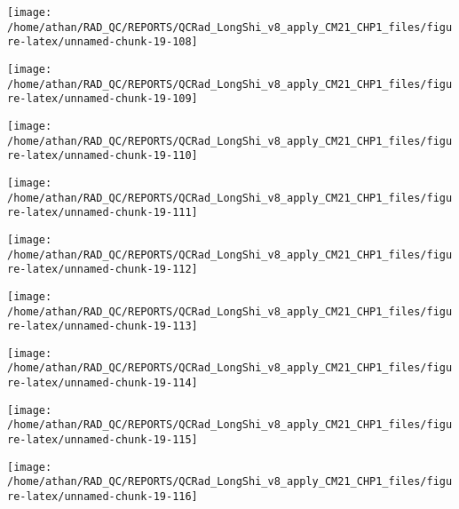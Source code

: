 \documentclass[
  10pt,
  a4paper,oneside]{article}
\begin{document}
\begin{center}\texttt{[image: /home/athan/RAD\_QC/REPORTS/QCRad\_LongShi\_v8\_apply\_CM21\_CHP1\_files/figure-latex/unnamed-chunk-19-108]} \end{center}

\begin{center}\texttt{[image: /home/athan/RAD\_QC/REPORTS/QCRad\_LongShi\_v8\_apply\_CM21\_CHP1\_files/figure-latex/unnamed-chunk-19-109]} \end{center}

\begin{center}\texttt{[image: /home/athan/RAD\_QC/REPORTS/QCRad\_LongShi\_v8\_apply\_CM21\_CHP1\_files/figure-latex/unnamed-chunk-19-110]} \end{center}

\begin{center}\texttt{[image: /home/athan/RAD\_QC/REPORTS/QCRad\_LongShi\_v8\_apply\_CM21\_CHP1\_files/figure-latex/unnamed-chunk-19-111]} \end{center}

\begin{center}\texttt{[image: /home/athan/RAD\_QC/REPORTS/QCRad\_LongShi\_v8\_apply\_CM21\_CHP1\_files/figure-latex/unnamed-chunk-19-112]} \end{center}

\begin{center}\texttt{[image: /home/athan/RAD\_QC/REPORTS/QCRad\_LongShi\_v8\_apply\_CM21\_CHP1\_files/figure-latex/unnamed-chunk-19-113]} \end{center}

\begin{center}\texttt{[image: /home/athan/RAD\_QC/REPORTS/QCRad\_LongShi\_v8\_apply\_CM21\_CHP1\_files/figure-latex/unnamed-chunk-19-114]} \end{center}

\begin{center}\texttt{[image: /home/athan/RAD\_QC/REPORTS/QCRad\_LongShi\_v8\_apply\_CM21\_CHP1\_files/figure-latex/unnamed-chunk-19-115]} \end{center}

\begin{center}\texttt{[image: /home/athan/RAD\_QC/REPORTS/QCRad\_LongShi\_v8\_apply\_CM21\_CHP1\_files/figure-latex/unnamed-chunk-19-116]} \end{center}
\end{document}
